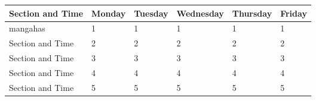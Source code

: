 \def \firstPeriod{1}
\def \secondPeriod{2}
\def \thirdPeriod{3}
\def \fourthPeriod{4}
\def \fifthPeriod{5}
\def \sixthPeriod{6}

\noindent\begin{minipage}[c]{\textwidth}
\begin{center}
  \begin{tabular}{ *{6}{|C{120pt}}|  }
    \hline
   \textbf{ Section and Time} & \textbf{Monday} & \textbf{Tuesday} & \textbf{Wednesday} & \textbf{Thursday} & \textbf{Friday} \\
    \hline
        mangahas & \firstPeriod & \firstPeriod & \firstPeriod & \firstPeriod & \firstPeriod \\
    \hline
        Section and Time & \secondPeriod & \secondPeriod & \secondPeriod & \secondPeriod & \secondPeriod \\
    \hline
        Section and Time & \thirdPeriod & \thirdPeriod & \thirdPeriod & \thirdPeriod & \thirdPeriod \\
    \hline
        Section and Time & \fourthPeriod & \fourthPeriod & \fourthPeriod & \fourthPeriod & \fourthPeriod \\
    \hline
        Section and Time & \fifthPeriod & \fifthPeriod & \fifthPeriod & \fifthPeriod & \fifthPeriod \\
  \hline
 \end{tabular}
\end{center}
\end{minipage}
